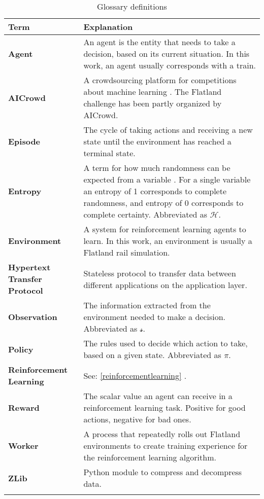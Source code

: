 \begin{longtable}{|m{3cm}|m{11cm}|}\hline
\rowcolor{gray} \textbf{Term}&
Explanation \\ 
\hline

\textbf{Agent}&
An agent is the entity that needs to take a decision, based on its current situation. In this work, an agent usually corresponds with a train.\\
\hline

\textbf{AICrowd}&
A crowdsourcing platform for competitions about machine learning \cite{aicrowd_startpage}. The Flatland challenge has been partly organized by AICrowd.\\ 
\hline

\textbf{Episode}&
The cycle of taking actions and receiving a new state until the environment has reached a terminal state. \\ 
\hline

\textbf{Entropy}&
A term for how much randomness can be expected from a variable \cite{entropy_shannon}.
For a single variable an entropy of 1 corresponds to complete randomness, and entropy of 0 corresponds to complete certainty.
Abbreviated as $\mathcal{H}$.\\ 
\hline

\textbf{Environment}&
A system for reinforcement learning agents to learn. In this work, an environment is usually a Flatland rail simulation.\\
\hline

\textbf{Hypertext Transfer Protocol}&
Stateless protocol to transfer data between different applications on the application layer. \\ \hline

\textbf{Observation}&
The information extracted from the environment needed to make a decision. Abbreviated as $\mathcal{s}$.\\ 
\hline

\textbf{Policy}&
The rules used to decide which action to take, based on a given state. Abbreviated as $\pi$.\\ 
\hline

\textbf{Reinforcement Learning}&
See: \ref{reinforcementlearning} \nameref{reinforcementlearning}.\\
\hline

\textbf{Reward}&
The scalar value an agent can receive in a reinforcement learning task. Positive for good actions, negative for bad ones.\\ 
\hline

\textbf{Worker}&
A process that repeatedly rolls out Flatland environments to create training experience for the reinforcement learning algorithm.\\
\hline

\textbf{ZLib}&
Python module to compress and decompress data. \\ \hline





\caption{Glossary definitions}
\label{tab:glossar}
\end{longtable}
\clearpage

